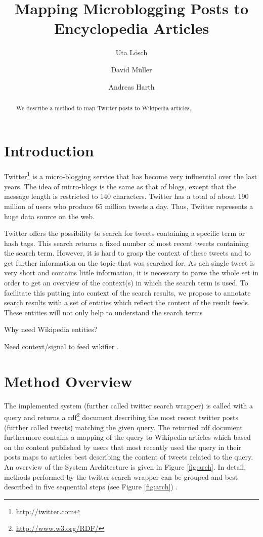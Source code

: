 \documentclass{llncs}
\title{Mapping Microblogging Posts to Encyclopedia Articles}
\author{Uta L\"{o}sch \and David M\"{u}ller \and Andreas Harth}
\institute{
	Karlsruhe Institute of Technology (KIT), D-76131 Karlsruhe, Germany\\ 
	\email{uta.loesch@kit.edu},\\
	\email{david.mueller@student.kit.edu},\\
	\email{harth@kit.edu}
}
\begin{document}
\maketitle

\begin{abstract}
We describe a method to map Twitter posts to Wikipedia articles.
\end{abstract}

\section{Introduction}

Twitter\footnote{\url{http://twitter.com}} is a micro-blogging service that has become very influential over the last years. The idea of micro-blogs is the same as that of blogs, except that the message length is restricted to 140 characters. Twitter has a total of about 190 million of users who produce 65 million tweets a day. Thus, Twitter represents a huge data source on the web.

Twitter offers the possibility to search for tweets containing a specific term or hash tags. This search returns a fixed number of most recent tweets containing the search term. However, it is hard to grasp the context of these tweets and to get further information on the topic that was searched for. As ach single tweet is very short and contains little information, it is necessary to parse the whole set in order to get an overview of the context(s) in which the search term is used. To facilitate this putting into context of the search results, we propose to annotate search results with a set of entities which reflect the content of the result feeds. These entities will not only help to understand the search terms

Why need Wikipedia entities?

Need context/signal to feed wikifier \cite{key:wikifier}.

\section{Method Overview}

The implemented system (further called twitter search wrapper) is called with
a query and returns a rdf\footnote{\url{http://www.w3.org/RDF/}} document
describing the most recent twitter posts (further called tweets) matching the
given query. The returned rdf document furthermore contains a mapping of the
query to Wikipedia articles which based on the content published by users that most recently used the query in their
posts maps to articles best describing the content of tweets related to the
query. An overview of the System Architecture is given in Figure \ref{fig:arch}.
In detail, methods performed by the twitter search wrapper can be grouped
and best described in five sequential steps (see Figure \ref{fig:arch}) .
 
\end{document}
